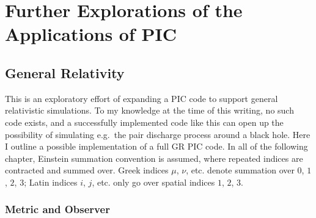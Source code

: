 
\chapter{Further Explorations of the Applications of PIC}
\label{chap:explorations}

\section{General Relativity}
\label{sec:general-relativity}

This is an exploratory effort of expanding a PIC code to support general
relativistic simulations. To my knowledge at the time of this writing, no such
code exists, and a successfully implemented code like this can open up the
possibility of simulating e.g.\ the pair discharge process around a black hole.
Here I outline a possible implementation of a full GR PIC code. In all of the
following chapter, Einstein summation convention is assumed, where repeated
indices are contracted and summed over. Greek indices $\mu$, $\nu$, etc. denote
summation over $0$, $1$, $2$, $3$; Latin indices $i$, $j$, etc. only go over
spatial indices $1$, $2$, $3$.

\subsection{Metric and Observer}
\label{sec:metric}

